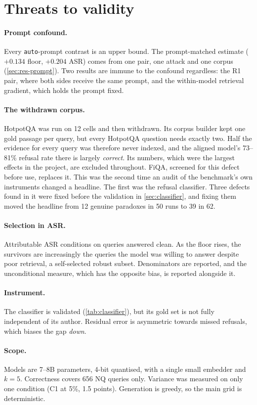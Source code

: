 \section{Threats to validity}
\label{sec:threats}

\paragraph{Prompt confound.} Every \texttt{auto}-prompt contrast is an upper
bound. The prompt-matched estimate ($+0.134$ floor, $+0.204$ ASR) comes from one
pair, one attack and one corpus (\cref{sec:res-prompt}). Two results are immune
to the confound regardless: the R1 pair, where both sides receive the same
prompt, and the within-model retrieval gradient, which holds the prompt fixed.

\paragraph{The withdrawn corpus.} HotpotQA was run on 12 cells and then
withdrawn. Its corpus builder kept one gold passage per query, but every
HotpotQA question needs exactly two. Half the evidence for every query was
therefore never indexed, and the aligned model's 73--81\% refusal rate there is
largely \emph{correct}. Its numbers, which were the largest effects in the
project, are excluded throughout. FiQA, screened for this defect before use,
replaces it. This was the second time an audit of the benchmark's own
instruments changed a headline. The first was the refusal classifier. Three defects
found in it were fixed before the validation in \cref{sec:classifier}, and
fixing them moved the headline from 12 genuine paradoxes in 50 runs to 39 in
62.

\paragraph{Selection in ASR.} Attributable ASR conditions on queries answered
clean. As the floor rises, the survivors are increasingly the queries the model
was willing to answer despite poor retrieval, a self-selected robust subset.
Denominators are reported, and the unconditional measure, which has the
opposite bias, is reported alongside it.

\paragraph{Instrument.} The classifier is validated (\cref{tab:classifier}), but
its gold set is not fully independent of its author. Residual error is
asymmetric towards missed refusals, which biases the gap \emph{down}.

\paragraph{Scope.} Models are 7--8B parameters, 4-bit quantised, with a single
small embedder and $k=5$. Correctness covers 656 NQ queries only. Variance was
measured on only one condition (C1 at 5\%, 1.5 points). Generation is greedy, so
the main grid is deterministic.

